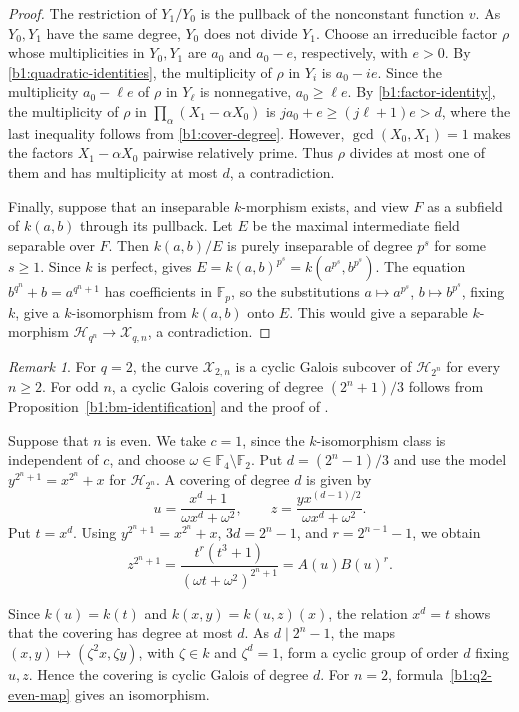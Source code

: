 \documentclass[12pt,reqno]{amsart}
\numberwithin{equation}{section}
\newcommand{\F}{\mathbb F}
\theoremstyle{plain}
\theoremstyle{definition}
\theoremstyle{remark}
\newtheorem{remark}[theorem]{Remark}
\begin{document}
\begin{proof}
The restriction of \(Y_1/Y_0\) is the pullback of the nonconstant
function \(v\). As \(Y_0,Y_1\) have the same degree,
\(Y_0\) does not divide \(Y_1\). Choose an irreducible factor
\(\rho\) whose multiplicities in \(Y_0,Y_1\) are \(a_0\) and
\(a_0-e\), respectively, with \(e>0\).
By \eqref{b1:quadratic-identities}, the multiplicity of \(\rho\)
in \(Y_i\) is \(a_0-ie\). Since the multiplicity \(a_0-\ell e\) of
\(\rho\) in \(Y_\ell\) is nonnegative, \(a_0\ge\ell e\).
By \eqref{b1:factor-identity}, the multiplicity of \(\rho\) in
\(\prod_\alpha(X_1-\alpha X_0)\) is
\(ja_0+e\ge(j\ell+1)e>d\), where the last inequality follows
from \eqref{b1:cover-degree}.
However, \(\gcd(X_0,X_1)=1\) makes the factors
\(X_1-\alpha X_0\) pairwise relatively prime.
Thus \(\rho\) divides at most one of them and has multiplicity
at most \(d\), a contradiction.

Finally, suppose that an inseparable \(k\)-morphism exists, and
view \(F\) as a subfield of \(k(a,b)\) through its pullback.
Let \(E\) be the maximal intermediate field separable over \(F\).
Then \(k(a,b)/E\) is purely inseparable of degree \(p^s\) for
some \(s\ge1\). Since \(k\) is perfect,
\cite[Proposition~3.10.2(c)]{Stichtenoth2009} gives
\(E=k(a,b)^{p^s}=k(a^{p^s},b^{p^s})\).
The equation \(b^{q^n}+b=a^{q^n+1}\) has
coefficients in \(\F_p\), so the substitutions
\(a\mapsto a^{p^s}\), \(b\mapsto b^{p^s}\), fixing \(k\),
give a \(k\)-isomorphism from \(k(a,b)\) onto \(E\).
This would give a separable \(k\)-morphism
\(\mathcal H_{q^n}\to\mathcal X_{q,n}\), a contradiction.
\end{proof}


\begin{remark}
\label{b1:q2-cover}
For \(q=2\), the curve \(\mathcal X_{2,n}\) is a cyclic Galois
subcover of \(\mathcal H_{2^n}\) for every \(n\ge2\).
For odd \(n\), a cyclic Galois covering of degree \((2^n+1)/3\)
follows from Proposition~\ref{b1:bm-identification} and the proof of
\cite[Lemma~2.4]{BM2018}.

Suppose that \(n\) is even. We take \(c=1\), since the
\(k\)-isomorphism class is independent of \(c\), and choose
\(\omega\in\F_4\setminus\F_2\). Put \(d=(2^n-1)/3\) and use
the model \(y^{2^n+1}=x^{2^n}+x\) for \(\mathcal H_{2^n}\).
A covering of degree \(d\) is given by
\begin{equation}
\label{b1:q2-even-map}
 u=\frac{x^d+1}{\omega x^d+\omega^2},\qquad
 z=\frac{yx^{(d-1)/2}}{\omega x^d+\omega^2}.
\end{equation}
Put \(t=x^d\). Using \(y^{2^n+1}=x^{2^n}+x\),
\(3d=2^n-1\), and \(r=2^{n-1}-1\), we obtain
\[
 z^{2^n+1}=\frac{t^r(t^3+1)}{(\omega t+\omega^2)^{2^n+1}}
 =A(u)B(u)^r.
\]

Since \(k(u)=k(t)\) and \(k(x,y)=k(u,z)(x)\), the relation
\(x^d=t\) shows that the covering has degree at most \(d\).
As \(d\mid2^n-1\), the maps
\((x,y)\mapsto(\zeta^2x,\zeta y)\), with
\(\zeta\in k\) and \(\zeta^d=1\), form a cyclic group of order
\(d\) fixing \(u,z\). Hence the covering is cyclic Galois of
degree \(d\).
For \(n=2\), formula~\eqref{b1:q2-even-map} gives an isomorphism.
\end{remark}
\end{document}
